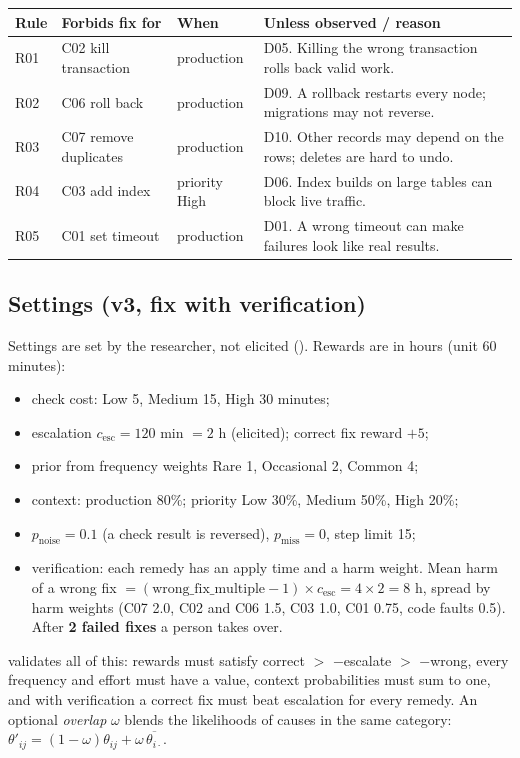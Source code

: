 \documentclass[11pt,a4paper]{article}
\newcommand{\file}[1]{{\small\path{#1}}}
\newcommand{\code}[1]{\path{#1}}
\begin{document}
\begin{center}\small
\begin{tabularx}{\linewidth}{@{}lllL@{}}
\toprule
Rule & Forbids fix for & When & Unless observed / reason \\
\midrule
R01 & C02 kill transaction & production & D05. Killing the wrong transaction rolls back valid work. \\
R02 & C06 roll back & production & D09. A rollback restarts every node; migrations may not reverse. \\
R03 & C07 remove duplicates & production & D10. Other records may depend on the rows; deletes are hard to undo. \\
R04 & C03 add index & priority High & D06. Index builds on large tables can block live traffic. \\
R05 & C01 set timeout & production & D01. A wrong timeout can make failures look like real results. \\
\bottomrule
\end{tabularx}
\end{center}

\subsection{Settings (v3, fix with verification)}

Settings are set by the researcher, not elicited (\file{pilot_settings_v3.json}). Rewards are in
hours (unit 60 minutes):
\begin{itemize}
  \item check cost: Low 5, Medium 15, High 30 minutes;
  \item escalation $c_{\text{esc}} = 120$ min $= 2$ h (elicited); correct fix reward $+5$;
  \item prior from frequency weights Rare 1, Occasional 2, Common 4;
  \item context: production 80\%; priority Low 30\%, Medium 50\%, High 20\%;
  \item $p_{\text{noise}} = 0.1$ (a check result is reversed), $p_{\text{miss}} = 0$, step limit 15;
  \item verification: each remedy has an apply time and a harm weight. Mean harm of a wrong fix
        $= (\text{wrong\_fix\_multiple} - 1)\times c_{\text{esc}} = 4 \times 2 = 8$ h, spread by harm
        weights (C07 2.0, C02 and C06 1.5, C03 1.0, C01 0.75, code faults 0.5). After
        \textbf{2 failed fixes} a person takes over.
\end{itemize}
\code{build_scenario} validates all of this: rewards must satisfy
correct $>$ $-$escalate $>$ $-$wrong, every frequency and effort must have a value, context
probabilities must sum to one, and with verification a correct fix must beat escalation for
every remedy. An optional \emph{overlap} $\omega$ blends the likelihoods of causes in the same
category: $\theta'_{ij} = (1-\omega)\theta_{ij} + \omega\,\overline{\theta_{i\cdot}}$.
\end{document}
